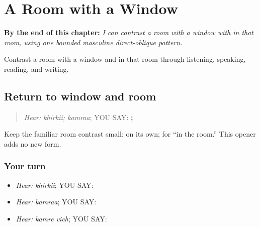 
\chapter{A Room with a Window}
\label{ch:pa-a2-vala-forms}

\begin{chapteropening}
\textbf{By the end of this chapter:} \emph{I can contrast a room with a window with in that room, using one bounded masculine direct-oblique pattern.}

Contrast a room with a window and in that room through listening, speaking, reading, and writing.
\end{chapteropening}

\section[\texorpdfstring{\pa{ਖਿੜਕੀ} · \pa{ਕਮਰਾ} … (khirkii; kamraa …)}{ਖਿੜਕੀ · ਕਮਰਾ … (khirkii; kamraa …)}]{Return to window and room}

\label{lesson:PA-C195-window-room-return}



\begin{quote}
\emph{Hear:} \emph{khirkii; kamraa}; YOU SAY: \textbf{; }
\end{quote}

\begin{grammarlens}[title={Grammar Lens}]
Keep the familiar room contrast small: \textbf{} on its own; \textbf{ } for “in the room.” This opener adds no new form.
\end{grammarlens}

\subsection*{Your turn}
\begin{itemize}
\raggedright
  \item \emph{Hear:} \emph{khirkii}; YOU SAY: \textbf{}
  \item \emph{Hear:} \emph{kamraa}; YOU SAY: \textbf{}
  \item \emph{Hear:} \emph{kamre vich}; YOU SAY: \textbf{ }
\end{itemize}

